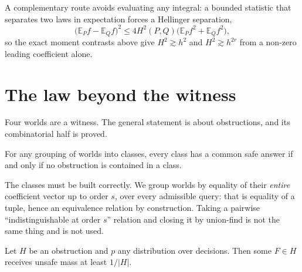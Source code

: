 A complementary route avoids evaluating any integral: a bounded statistic that separates two
laws in expectation forces a Hellinger separation,
\begin{equation}
\bigl(\mathbb{E}_{P}f-\mathbb{E}_{Q}f\bigr)^{2}\le 4H^{2}(P,Q)\bigl(\mathbb{E}_{P}f^{2}+\mathbb{E}_{Q}f^{2}\bigr),
\label{eq:cs}
\end{equation}
so the exact moment contrasts above give $H^{2}\gtrsim h^{2}$ and $H^{2}\gtrsim h^{2r}$ from
a non-zero leading coefficient alone.



\section{The law beyond the witness}
\label{sec:law}

Four worlds are a witness. The general statement is about obstructions, and its
combinatorial half is proved.

\begin{theorem}
\label{thm:classes}
For any grouping of worlds into classes, every class has a common safe answer if and only if
no obstruction is contained in a class.
\end{theorem}


The classes must be built correctly. We group worlds by equality of their \emph{entire}
coefficient vector up to order $s$, over every admissible query: that is equality of a tuple,
hence an equivalence relation by construction. Taking a pairwise ``indistinguishable at order
$s$'' relation and closing it by union-find is not the same thing and is not used.

\begin{theorem}
\label{thm:floor}
Let $H$ be an obstruction and $p$ any distribution over decisions. Then some $F\in H$
receives unsafe mass at least $1/|H|$.
\end{theorem}


